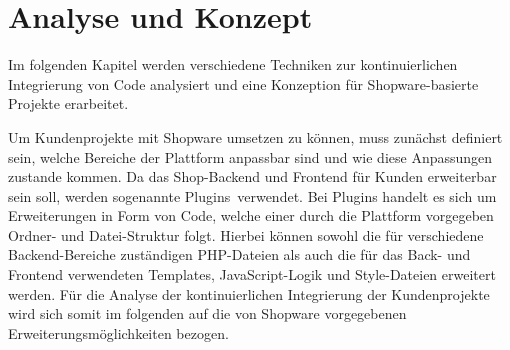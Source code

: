 
\section{Analyse und Konzept} \label{sec:03-concept}

Im folgenden Kapitel werden verschiedene Techniken zur kontinuierlichen Integrierung von Code analysiert und eine
Konzeption für Shopware-basierte Projekte erarbeitet.

Um Kundenprojekte mit Shopware umsetzen zu können, muss zunächst definiert sein, welche Bereiche der Plattform
anpassbar sind und wie diese Anpassungen zustande kommen.
Da das Shop-Backend und Frontend für Kunden erweiterbar sein soll, werden sogenannte \glqq Plugins\grqq\ verwendet.
Bei Plugins handelt es sich um Erweiterungen in Form von Code, welche einer durch die Plattform vorgegeben Ordner-
und Datei-Struktur folgt.
Hierbei können sowohl die für verschiedene Backend-Bereiche zuständigen PHP-Dateien als auch die für das Back- und
Frontend verwendeten Templates, JavaScript-Logik und Style-Dateien erweitert werden.
Für die Analyse der kontinuierlichen Integrierung der Kundenprojekte wird sich somit im folgenden auf die von Shopware
vorgegebenen Erweiterungsmöglichkeiten bezogen.

\clearpage
